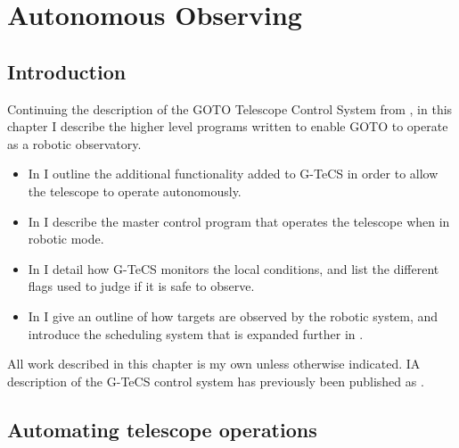 
\chapter{Autonomous Observing}
\label{chap:autonomous}


\chaptoc{}


\section{Introduction}
\label{sec:autonomous_intro}


\begin{colsection}

Continuing the description of the GOTO Telescope Control System from , in this chapter I describe the higher level programs written to enable GOTO to operate as a robotic observatory.
%
\begin{itemize}
    \item In  I outline the additional functionality added to G-TeCS in order to allow the telescope to operate autonomously.
    \item In  I describe the master control program that operates the telescope when in robotic mode.
    \item In  I detail how G-TeCS monitors the local conditions, and list the different flags used to judge if it is safe to observe.
    \item In  I give an outline of how targets are observed by the robotic system, and introduce the scheduling system that is expanded further in .
\end{itemize}
%
All work described in this chapter is my own unless otherwise indicated. IA description of the G-TeCS control system has previously been published as \citet{Dyer}.

\end{colsection}


\section{Automating telescope operations}
\label{sec:auto}

